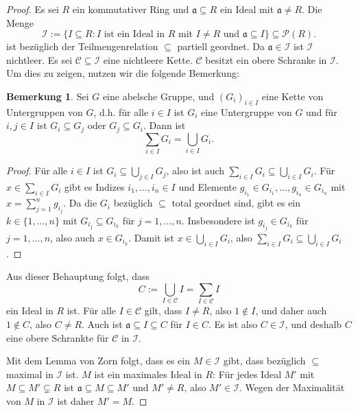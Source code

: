 \documentclass[a4paper,10pt]{article}
\newcounter{satze}
\theoremstyle{definition}
\newtheorem{bem}[satze]{Bemerkung}
\newcommand{\mf}[1]{\mathfrak{#1}}
\newcommand{\mc}[1]{\mathcal{#1}}
\begin{document}
\begin{proof}
Es sei $R$ ein kommutativer Ring und $\mf{a} \subseteq R$ ein Ideal mit $\mf{a} \neq R$. Die Menge
\[
 \mc{I} := \{I \subseteq R : I \text{ ist ein Ideal in $R$ mit $I \neq R$ und $\mf{a} \subseteq I$} \} \subseteq \mc{P}(R).
\]
ist bezüglich der Teilmengenrelation $\subseteq$ partiell geordnet. Da $\mf{a} \in \mc{I}$ ist $\mc{I}$ nichtleer. Es sei $\mc{C} \subseteq \mc{I}$ eine nichtleere Kette. $\mc{C}$ besitzt ein obere Schranke in $\mc{I}$. Um dies zu zeigen, nutzen wir die folgende Bemerkung:

\begin{bem}
 Sei $G$ eine abelsche Gruppe, und $(G_i)_{i \in I}$ eine Kette von Untergruppen von $G$, d.h. für alle $i \in I$ ist $G_i$ eine Untergruppe von $G$ und für $i,j \in I$ ist $G_i \subseteq G_j$ oder $G_j \subseteq G_i$. Dann ist
 \[
  \sum_{i \in I} G_i = \bigcup_{i \in I} G_i.
 \]
\end{bem}
\begin{proof}
 Für alle $i \in I$ ist $G_i \subseteq \bigcup_{j \in I} G_j$, also ist auch $\sum_{i \in I} G_i \subseteq \bigcup_{i \in I} G_i$. Für $x \in \sum_{i \in I} G_i$ gibt es Indizes $i_1, \ldots, i_n \in I$ und Elemente $g_{i_1} \in G_{i_1}, \ldots, g_{i_n} \in G_{i_n}$ mit $x = \sum_{j=1}^n g_{i_j}$. Da die $G_i$ bezüglich $\subseteq$ total geordnet sind, gibt es ein $k \in \{1, \ldots, n\}$ mit $G_{i_j} \subseteq G_{i_k}$ für $j=1,\ldots,n$. Insbesondere ist $g_{i_j} \in G_{i_k}$ für $j=1,\ldots,n$, also auch $x \in G_{i_k}$. Damit ist $x \in \bigcup_{i \in I} G_i$, also $\sum_{i \in I} G_i \subseteq \bigcup_{i \in I} G_i$.
\end{proof}

Aus dieser Behauptung folgt, dass
\[
 C := \bigcup_{I \in \mc{C}} I = \sum_{I \in \mc{C}} I
\]
ein Ideal in $R$ ist.
Für alle $I \in \mc{C}$ gilt, dass $I \neq R$, also $1 \not\in I$, und daher auch $1 \not\in C$, also $C \neq R$. Auch ist $\mf{a} \subseteq I \subseteq C$ für $I \in C$. Es ist also $C \in \mc{I}$, und deshalb $C$ eine obere Schrankte für $\mc{C}$ in $\mc{I}$.

Mit dem Lemma von Zorn folgt, dass es ein $M \in \mc{I}$ gibt, dass bezüglich $\subseteq$ maximal in $\mc{I}$ ist. $M$ ist ein maximales Ideal in $R$: Für jedes Ideal $M'$ mit $M \subseteq M' \subsetneq R$ ist $\mf{a} \subseteq M \subseteq M'$ und $M' \neq R$, also $M' \in \mc{I}$. Wegen der Maximalität von $M$ in $\mc{I}$ ist daher $M' = M$.
\end{proof}
\end{document}
